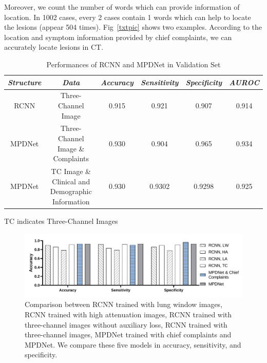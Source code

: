 \documentclass[journal]{IEEEtran}
\begin{document}
Moreover, we count the number of words which can provide information of location. In 1002 cases, every 2 cases contain 1 words which can help to locate the lesions (appear 504 times). 
Fig~\ref{txtpic} shows two examples. According to the location and symptom information provided by chief complaints, we can accurately locate lesions in CT. 


\begin{table}[t]
    \caption{Performances of RCNN and MPDNet in Validation Set}
    \begin{center}
    \begin{tabular}{c|c|c|c|c|c}
    \hline
    \textbf{\textit{Structure}} & \textbf{\textit{Data}}& \textbf{\textit{Accuracy}}  & \textbf{\textit{Sensitivity}} & \textbf{\textit{Specificity}} & \textbf{\textit{AUROC}}\\
    \hline
    RCNN & Three-Channel Image&  0.915 & 0.921 &  0.907 &  0.914 \\
    MPDNet & Three-Channel Image \& Complaints &  0.930 & 0.904 &  0.965 & 0.934 \\
    MPDNet & TC Image \& Clinical and Demographic Information&   0.930 & 0.9302 &  0.9298 & 0.925 \\
    \hline
    \end{tabular}
    \vspace{-0cm}
    \end{center}
    \footnotesize{TC indicates Three-Channel Images}

    \vspace{-0cm}
    \label{mpdnetres}
    \end{table}


\begin{figure}[htbp]
    \centerline{\includegraphics[width=170mm]{figureALL.pdf}}
    \vspace{-0cm}
    \caption{Comparison between RCNN trained with lung window images, RCNN trained with high attenuation images, RCNN trained with three-channel images without auxiliary loss, RCNN trained with three-channel images, MPDNet trained with chief complaints and MPDNet. We compare these five models in accuracy, sensitivity, and specificity.}
    \vspace{-0cm}
    \label{figureALL}

    \end{figure}
\end{document}
